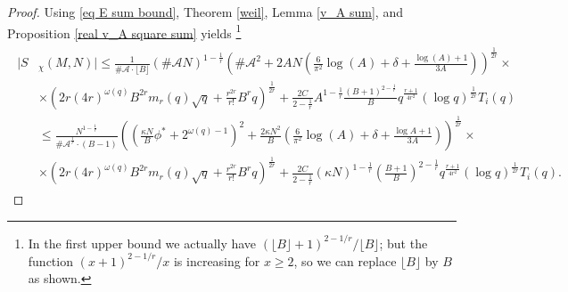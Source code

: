 \documentclass[12pt]{amsart}
\theoremstyle{plain}
\theoremstyle{definition}
\newcommand{\cA}{{\mathcal{A}}}
\begin{document}
\begin{proof}
Using \eqref{eq E sum bound}, Theorem \ref{weil}, Lemma \ref{v_A sum}, and Proposition \ref{real v_A square sum} yields
\footnote{In the first upper bound we actually have $(\lfloor B\rfloor+1)^{2-1/r}/\lfloor B\rfloor$; but the function $(x+1)^{2-1/r}/x$ is increasing for $x\ge2$, so we can replace $\lfloor B\rfloor$ by $B$ as shown.}
\begin{align}\label{eq together}
\begin{split}
    |S&_\chi(M, N)|
    \le
    \frac{1}{\#\cA\cdot \lfloor B\rfloor}\left(\#\cA N\right)^{1-\frac{1}{r}}
    \left(\#\cA^2 + 2AN\left(\frac{6}{\pi^2}\log{(A)}+\delta+\frac{\log{(A)}+1}{3A}\right)\right)^{\frac{1}{2r}}\times
    \\
    &\times\left(2r(4r)^{\omega(q)} B^{2r}m_r(q)\sqrt{q} + \frac{r^{2r}}{r!} B^r q\right)^\frac{1}{2r}+\frac{2C}{2-\frac{1}{r}} A^{1-\frac{1}{r}} \frac{(B+1)^{2-\frac{1}{r}}}{B} q^{\frac{r+1}{4r^2}} (\log q)^{\frac{1}{2r}} T_i(q)\\
    &\le \frac{N^{1-\frac{1}{r}}}{\#\cA^{\frac{1}{r}}\cdot (B-1)}\left(\left(\frac{\kappa N}{B}\phi^*+2^{\omega(q)-1}\right)^2 + \frac{2\kappa N^2}{B}\left(\frac{6}{\pi^2}\log{(A)}+\delta+\frac{\log{A}+1}{3A}\right)\right)^{\frac{1}{2r}}\times
    \\
    &\times\left(2r(4r)^{\omega(q)} B^{2r}m_r(q)\sqrt{q} + \frac{r^{2r}}{r!} B^r q\right)^\frac{1}{2r}+\frac{2C}{2-\frac{1}{r}}(\kappa N)^{1-\frac{1}{r}}\left(\frac{B+1}{B}\right)^{2-\frac{1}{r}}q^{\frac{r+1}{4r^2}} (\log q)^{\frac{1}{2r}} T_i(q).
\end{split}
\end{align}



\end{proof}
\end{document}
